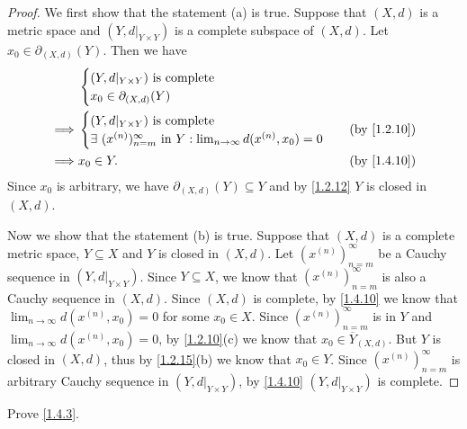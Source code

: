 \begin{proof}
  We first show that the statement (a) is true.
  Suppose that \((X, d)\) is a metric space and \((Y, d|_{Y \times Y})\) is a complete subspace of \((X, d)\).
  Let \(x_0 \in \partial_{(X, d)}(Y)\).
  Then we have
  \begin{align*}
             & \begin{cases}
                 (Y, d|_{Y \times Y}) \text{ is complete} \\
                 x_0 \in \partial_{(X, d)}(Y)
               \end{cases}                                                                              \\
    \implies & \begin{cases}
                 (Y, d|_{Y \times Y}) \text{ is complete} \\
                 \exists\ (x^{(n)})_{n = m}^\infty \text{ in } Y : \lim_{n \to \infty} d(x^{(n)}, x_0) = 0
               \end{cases} & \text{(by \cref{1.2.10})}                              \\
    \implies & x_0 \in Y.                                                                                & \text{(by \cref{1.4.10})}
  \end{align*}
  Since \(x_0\) is arbitrary, we have \(\partial_{(X, d)}(Y) \subseteq Y\) and by \cref{1.2.12} \(Y\) is closed in \((X, d)\).

  Now we show that the statement (b) is true.
  Suppose that \((X, d)\) is a complete metric space, \(Y \subseteq X\) and \(Y\) is closed in \((X, d)\).
  Let \((x^{(n)})_{n = m}^\infty\) be a Cauchy sequence in \((Y, d|_{Y \times Y})\).
  Since \(Y \subseteq X\), we know that \((x^{(n)})_{n = m}^\infty\) is also a Cauchy sequence in \((X, d)\).
  Since \((X, d)\) is complete, by \cref{1.4.10} we know that \(\lim_{n \to \infty} d(x^{(n)}, x_0) = 0\) for some \(x_0 \in X\).
  Since \((x^{(n)})_{n = m}^\infty\) is in \(Y\) and \(\lim_{n \to \infty} d(x^{(n)}, x_0) = 0\), by \cref{1.2.10}(c) we know that \(x_0 \in \overline{Y}_{(X, d)}\).
  But \(Y\) is closed in \((X, d)\), thus by \cref{1.2.15}(b) we know that \(x_0 \in Y\).
  Since \((x^{(n)})_{n = m}^\infty\) is arbitrary Cauchy sequence in \((Y, d|_{Y \times Y})\), by \cref{1.4.10} \((Y, d|_{Y \times Y})\) is complete.
\end{proof}

\exercisesection

\begin{ex}\label{ex:1.4.1}
  Prove \cref{1.4.3}.
\end{ex}

